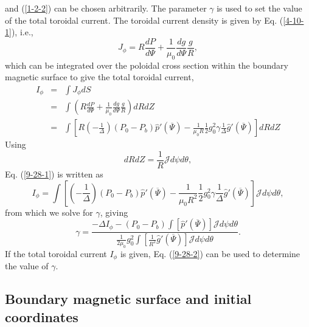 \documentclass{article}
\begin{document}
and (\ref{1-2-2}) can be chosen arbitrarily. The parameter $\gamma$ is used to
set the value of the total toroidal current. The toroidal current density is
given by Eq. (\ref{4-10-1}), i.e.,
\begin{equation}
  J_{\phi} = R \frac{d P}{d \Psi} + \frac{1}{\mu_0} \frac{d g}{d \Psi}
  \frac{g}{R},
\end{equation}
which can be integrated over the poloidal cross section within the boundary
magnetic surface to give the total toroidal current,
\begin{eqnarray}
  I_{\phi} & = & \int J_{\phi} d S \nonumber\\
  & = & \int \left( R \frac{d P}{d \Psi} + \frac{1}{\mu_0} \frac{d g}{d \Psi}
  \frac{g}{R} \right) d R d Z \nonumber\\
  & = & \int \left[ R \left( - \frac{1}{\Delta} \right) (P_0 - P_b) \hat{p}'
  (\overline{\Psi}) - \frac{1}{\mu_0 R}  \frac{1}{2} g_0^2 \gamma
  \frac{1}{\Delta} \hat{g}' (\overline{\Psi}) \right] d R d Z  \label{9-28-1}
\end{eqnarray}
Using
\begin{equation}
  d R d Z = \frac{1}{R} \mathcal{J}d \psi d \theta,
\end{equation}
Eq. (\ref{9-28-1}) is written as
\begin{equation}
  I_{\phi} = \int \left[ \left( - \frac{1}{\Delta} \right) (P_0 - P_b)
  \hat{p}' (\overline{\Psi}) - \frac{1}{\mu_0 R^2} \frac{1}{2} g_0^2 \gamma
  \frac{1}{\Delta} \hat{g}' (\overline{\Psi}) \right] \mathcal{J}d \psi d
  \theta,
\end{equation}
from which we solve for $\gamma$, giving
\begin{equation}
  \label{9-28-2} \gamma = \frac{- \Delta I_{\phi} - (P_0 - P_b) \int [\hat{p}'
  (\overline{\Psi})] \mathcal{J}d \psi d \theta}{\frac{1}{2 \mu_0} g_0^2 \int
  \left[ \frac{1}{R^2} \hat{g}' (\overline{\Psi}) \right] \mathcal{J}d \psi d
  \theta} .
\end{equation}
If the total toroidal current $I_{\phi}$ is given, Eq. (\ref{9-28-2}) can be
used to determine the value of $\gamma$.

\subsection{Boundary magnetic surface and initial coordinates}
\end{document}
